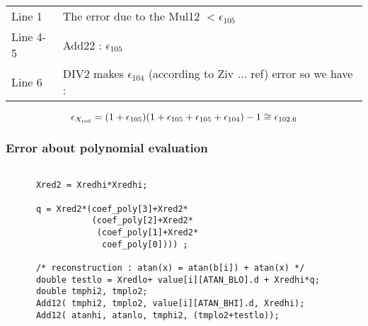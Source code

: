 \begin{tabular}{ll}
Line 1 & The error due to the Mul12 $< \epsilon_{105}$\\
Line 4-5 & Add22 : $\epsilon_{105}$\\
Line 6 & DIV2 makes $\epsilon_{104}$ (according to Ziv ... ref) error so we have :
\end{tabular}

\begin {equation}
\epsilon_{X_{\mathrm{red}}} = (1+\epsilon_{105})(1+\epsilon_{105}+\epsilon_{105}+\epsilon_{104})-1 \cong
\epsilon_{102.6}
\end {equation}

\subsubsection{Error about polynomial evaluation}
\begin{lstlisting}[caption={Polynomial Evaluation},firstnumber=1]

      Xred2 = Xredhi*Xredhi;
      
      q = Xred2*(coef_poly[3]+Xred2*
                 (coef_poly[2]+Xred2*
                  (coef_poly[1]+Xred2*
                   coef_poly[0]))) ;

      /* reconstruction : atan(x) = atan(b[i]) + atan(x) */
      double testlo = Xredlo+ value[i][ATAN_BLO].d + Xredhi*q;
      double tmphi2, tmplo2;
      Add12( tmphi2, tmplo2, value[i][ATAN_BHI].d, Xredhi);
      Add12( atanhi, atanlo, tmphi2, (tmplo2+testlo));

\end{lstlisting}
